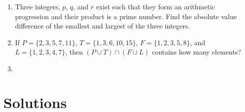 \documentclass[../uilmath.tex]{subfiles}
\begin{document}
\begin{enumerate}[label=\bfseries\arabic*.]
    \item %
    Three integers, $p$, $q$, and $r$ exist such that they form an arithmetic progression and their product is a prime number. Find the absolute value difference of the smallest and largest of the three integers.

    \item %
    If $P=\{2,3,5,7,11\}$, $T=\{1,3,6,10,15\}$, $F=\{1,2,3,5,8\}$, and $L=\{1,2,3,4,7\}$, then $(P\cup T)\cap (F\cup L)$ contains how many elements?

    \item %
    
\end{enumerate}

\section*{Solutions}
\end{document}

